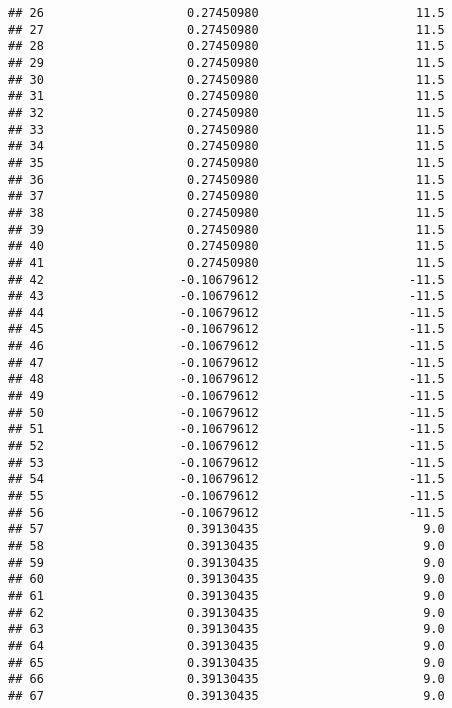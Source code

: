 \documentclass[]{article}
\begin{document}
\begin{verbatim}
## 26                    0.27450980                      11.5
## 27                    0.27450980                      11.5
## 28                    0.27450980                      11.5
## 29                    0.27450980                      11.5
## 30                    0.27450980                      11.5
## 31                    0.27450980                      11.5
## 32                    0.27450980                      11.5
## 33                    0.27450980                      11.5
## 34                    0.27450980                      11.5
## 35                    0.27450980                      11.5
## 36                    0.27450980                      11.5
## 37                    0.27450980                      11.5
## 38                    0.27450980                      11.5
## 39                    0.27450980                      11.5
## 40                    0.27450980                      11.5
## 41                    0.27450980                      11.5
## 42                   -0.10679612                     -11.5
## 43                   -0.10679612                     -11.5
## 44                   -0.10679612                     -11.5
## 45                   -0.10679612                     -11.5
## 46                   -0.10679612                     -11.5
## 47                   -0.10679612                     -11.5
## 48                   -0.10679612                     -11.5
## 49                   -0.10679612                     -11.5
## 50                   -0.10679612                     -11.5
## 51                   -0.10679612                     -11.5
## 52                   -0.10679612                     -11.5
## 53                   -0.10679612                     -11.5
## 54                   -0.10679612                     -11.5
## 55                   -0.10679612                     -11.5
## 56                   -0.10679612                     -11.5
## 57                    0.39130435                       9.0
## 58                    0.39130435                       9.0
## 59                    0.39130435                       9.0
## 60                    0.39130435                       9.0
## 61                    0.39130435                       9.0
## 62                    0.39130435                       9.0
## 63                    0.39130435                       9.0
## 64                    0.39130435                       9.0
## 65                    0.39130435                       9.0
## 66                    0.39130435                       9.0
## 67                    0.39130435                       9.0

\end{verbatim}
\end{document}

